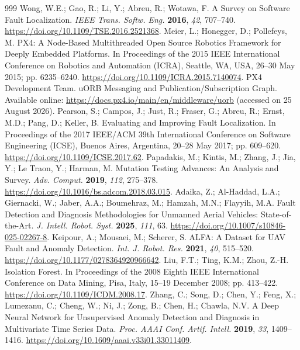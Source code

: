 \documentclass[drones,article,submit,moreauthors]{Definitions/mdpi}
\begin{document}
\begin{thebibliography}{999}
 Wong, W.E.; Gao, R.; Li, Y.; Abreu, R.; Wotawa, F. A Survey on Software Fault Localization. \textit{IEEE Trans. Softw. Eng.} \textbf{2016}, \textit{42}, 707--740. \href{https://doi.org/10.1109/TSE.2016.2521368}{https://doi.org/10.1109/TSE.2016.2521368}.
 Meier, L.; Honegger, D.; Pollefeys, M. PX4: A Node-Based Multithreaded Open Source Robotics Framework for Deeply Embedded Platforms. In Proceedings of the 2015 IEEE International Conference on Robotics and Automation (ICRA), Seattle, WA, USA, 26--30 May 2015; pp. 6235--6240. \href{https://doi.org/10.1109/ICRA.2015.7140074}{https://doi.org/10.1109/ICRA.2015.7140074}.
 PX4 Development Team. uORB Messaging and Publication/Subscription Graph. Available online: \url{https://docs.px4.io/main/en/middleware/uorb} (accessed on 25 August 2026).
 Pearson, S.; Campos, J.; Just, R.; Fraser, G.; Abreu, R.; Ernst, M.D.; Pang, D.; Keller, B. Evaluating and Improving Fault Localization. In Proceedings of the 2017 IEEE/ACM 39th International Conference on Software Engineering (ICSE), Buenos Aires, Argentina, 20--28 May 2017; pp. 609--620. \href{https://doi.org/10.1109/ICSE.2017.62}{https://doi.org/10.1109/ICSE.2017.62}.
 Papadakis, M.; Kintis, M.; Zhang, J.; Jia, Y.; Le Traon, Y.; Harman, M. Mutation Testing Advances: An Analysis and Survey. \textit{Adv. Comput.} \textbf{2019}, \textit{112}, 275--378. \href{https://doi.org/10.1016/bs.adcom.2018.03.015}{https://doi.org/10.1016/bs.adcom.2018.03.015}.
 Adaika, Z.; Al-Haddad, L.A.; Giernacki, W.; Jaber, A.A.; Boumehraz, M.; Hamzah, M.N.; Flayyih, M.A. Fault Detection and Diagnosis Methodologies for Unmanned Aerial Vehicles: State-of-the-Art. \textit{J. Intell. Robot. Syst.} \textbf{2025}, \textit{111}, 63. \href{https://doi.org/10.1007/s10846-025-02267-8}{https://doi.org/10.1007/s10846-025-02267-8}.
 Keipour, A.; Mousaei, M.; Scherer, S. ALFA: A Dataset for UAV Fault and Anomaly Detection. \textit{Int. J. Robot. Res.} \textbf{2021}, \textit{40}, 515--520. \href{https://doi.org/10.1177/0278364920966642}{https://doi.org/10.1177/0278364920966642}.
 Liu, F.T.; Ting, K.M.; Zhou, Z.-H. Isolation Forest. In Proceedings of the 2008 Eighth IEEE International Conference on Data Mining, Pisa, Italy, 15--19 December 2008; pp. 413--422. \href{https://doi.org/10.1109/ICDM.2008.17}{https://doi.org/10.1109/ICDM.2008.17}.
 Zhang, C.; Song, D.; Chen, Y.; Feng, X.; Lumezanu, C.; Cheng, W.; Ni, J.; Zong, B.; Chen, H.; Chawla, N.V. A Deep Neural Network for Unsupervised Anomaly Detection and Diagnosis in Multivariate Time Series Data. \textit{Proc. AAAI Conf. Artif. Intell.} \textbf{2019}, \textit{33}, 1409--1416. \href{https://doi.org/10.1609/aaai.v33i01.33011409}{https://doi.org/10.1609/aaai.v33i01.33011409}.

\end{thebibliography}
\end{document}
